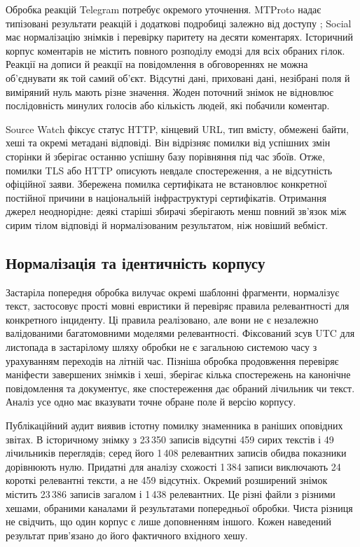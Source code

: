 Обробка реакцій Telegram потребує окремого уточнення. MTProto надає типізовані результати реакцій і додаткові подробиці залежно від доступу \citep{telegram2026reactions}; Social має нормалізацію знімків і перевірку паритету на десяти коментарях. Історичний корпус коментарів не містить повного розподілу емодзі для всіх обраних гілок. Реакції на дописи й реакції на повідомлення в обговореннях не можна об'єднувати як той самий об'єкт. Відсутні дані, приховані дані, незібрані поля й виміряний нуль мають різне значення. Жоден поточний знімок не відновлює послідовність минулих голосів або кількість людей, які побачили коментар.

Source Watch фіксує статус HTTP, кінцевий URL, тип вмісту, обмежені байти, хеші та окремі метадані відповіді. Він відрізняє помилки від успішних змін сторінки й зберігає останню успішну базу порівняння під час збоїв. Отже, помилки TLS або HTTP описують невдале спостереження, а не відсутність офіційної заяви. Збережена помилка сертифіката не встановлює конкретної постійної причини в національній інфраструктурі сертифікатів. Отримання джерел неоднорідне: деякі старіші збирачі зберігають менш повний зв'язок між сирим тілом відповіді й нормалізованим результатом, ніж новіший вебміст.

\subsection{Нормалізація та ідентичність корпусу}
Застаріла попередня обробка вилучає окремі шаблонні фрагменти, нормалізує текст, застосовує прості мовні евристики й перевіряє правила релевантності для конкретного інциденту. Ці правила реалізовано, але вони не є незалежно валідованими багатомовними моделями релевантності. Фіксований зсув UTC для листопада в застарілому шляху обробки не є загальною системою часу з урахуванням переходів на літній час. Пізніша обробка продовження перевіряє маніфести завершених знімків і хеші, зберігає кілька спостережень на канонічне повідомлення та документує, яке спостереження дає обраний лічильник чи текст. Аналіз усе одно має вказувати точне обране поле й версію корпусу.

Публікаційний аудит виявив істотну помилку знаменника в раніших оповідних звітах. В історичному знімку з 23\,350 записів відсутні 459 сирих текстів і 49 лічильників переглядів; серед його 1\,408 релевантних записів обидва показники дорівнюють нулю. Придатні для аналізу схожості 1\,384 записи виключають 24 короткі релевантні тексти, а не 459 відсутніх. Окремий розширений знімок містить 23\,386 записів загалом і 1\,438 релевантних. Це різні файли з різними хешами, обраними каналами й результатами попередньої обробки. Чиста різниця не свідчить, що один корпус є лише доповненням іншого. Кожен наведений результат прив'язано до його фактичного вхідного хешу.

